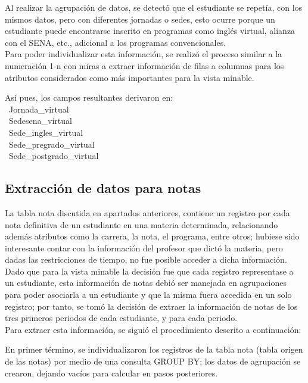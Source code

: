 \documentclass[fleqn,10pt]{SelfArx} %
\begin{document}
Al realizar la agrupación de datos, se detectó que el estudiante se repetía, con los mismos datos, pero con diferentes jornadas o sedes, esto ocurre porque un estudiante puede encontrarse inscrito en programas como inglés virtual, alianza con el SENA, etc., adicional a los programas convencionales.\\

Para poder individualizar esta información, se realizó el proceso similar a la numeración 1-n con miras a extraer información de filas a columnas para los atributos considerados como más importantes para la vista minable.

Así pues, los campos resultantes derivaron en:\\

\textbullet \ Jornada\_virtual \\ 
\textbullet \ Sedesena\_virtual\\
\textbullet \ Sede\_ingles\_virtual\\
\textbullet \ Sede\_pregrado\_virtual\\
\textbullet \ Sede\_postgrado\_virtual\\

\subsection{Extracción de datos para notas}

La tabla nota discutida en apartados anteriores, contiene un registro por cada nota definitiva de un estudiante en una materia determinada, relacionando además atributos como la carrera, la nota, el programa, entre otros; hubiese sido interesante contar con la información del profesor que dictó la materia, pero dadas las restricciones de tiempo, no fue posible acceder a dicha información.\\

Dado que para la vista minable la decisión fue que cada registro representase a un estudiante, esta información de notas debió ser manejada en agrupaciones para poder asociarla a un estudiante y que la misma fuera accedida en un solo registro; por tanto, se tomó la decisión de extraer la información de notas de los tres primeros periodos de cada estudiante, y para cada periodo.\\

Para extraer esta información, se siguió el procedimiento descrito a continuación:

En primer término, se individualizaron los registros de la tabla nota (tabla origen de las notas) por medio de una consulta GROUP BY; los datos de agrupación se crearon, dejando vacíos para calcular en pasos posteriores.\\
\end{document}
